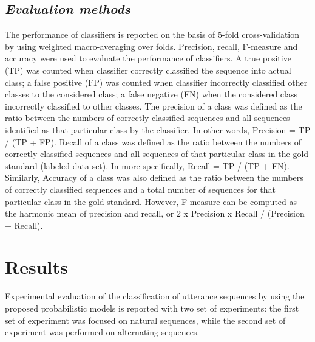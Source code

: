 \documentclass{amia}
\begin{document}
\subsection*{\textit{Evaluation methods}}
The performance of classifiers is reported on the basis of 5-fold cross-validation by using weighted macro-averaging over folds. Precision, recall, F-measure and accuracy were used to evaluate the performance of classifiers. A true positive (TP) was counted when classifier correctly classified the sequence into actual class; a false positive (FP) was counted when classifier incorrectly classified other classes to the considered class; a false negative (FN) when the considered class incorrectly classified to other classes. The precision of a class was defined as the ratio between the numbers of correctly classified sequences and all sequences identified as that particular class by the classifier. In other words, Precision = TP / (TP + FP). Recall of a class was defined as the ratio between the numbers of correctly classified sequences and all sequences of that particular class in the gold standard (labeled data set). In more specifically, Recall = TP / (TP + FN). Similarly, Accuracy of a class was also defined as the ratio between the numbers of correctly classified sequences and a total number of sequences for that particular class in the gold standard. However, F-measure can be computed as the harmonic mean of precision and recall, or 2 x Precision x Recall / (Precision + Recall).  

\section*{Results}
Experimental evaluation of the classification of utterance sequences by using the proposed probabilistic models is reported with two set of experiments: the first set of experiment was focused on natural sequences, while the second set of experiment was performed on alternating sequences. 
\end{document}
